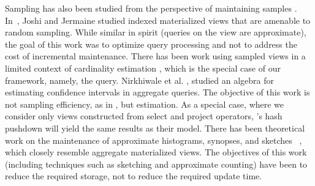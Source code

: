 Sampling has also been studied from the perspective of maintaining samples \cite{DBLP:conf/icde/OlkenR92}.
In~\cite{joshi2008materialized}, Joshi and Jermaine studied indexed materialized views that are amenable to random sampling.
While similar in spirit (queries on the view are approximate), the goal of this work was to optimize query processing and not to address the cost of incremental maintenance.
There has been work using sampled views in a limited context of cardinality estimation \cite{larson2007cardinality}, which is the special case of our framework, namely, the \countfunc query.
Nirkhiwale et al. \cite{DBLP:journals/pvldb/NirkhiwaleDJ13}, studied an algebra for estimating confidence intervals in aggregate queries.
The objective of this work is not sampling efficiency, as in \svc, but estimation.
As a special case, where we consider only views constructed from select and project operators, \svc's hash pushdown will yield the same results as their model.
There has been theoretical work on the maintenance of approximate histograms, synopses, and sketches ~\cite{gibbons1997fast, DBLP:journals/ftdb/CormodeGHJ12}, which closely resemble aggregate materialized views.
The objectives of this work (including techniques such as sketching and approximate counting) have been to reduce the required storage, not to reduce the required update time.

